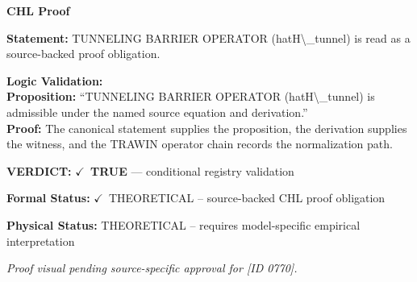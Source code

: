 \vspace{0.45em}
\noindent\textbf{CHL Proof}\par
\textbf{Statement:} TUNNELING BARRIER OPERATOR (hatH\textbackslash{}\_tunnel) is read as a source-backed proof obligation.

\textbf{Logic Validation:}\\
\textbf{Proposition:} ``TUNNELING BARRIER OPERATOR (hatH\textbackslash{}\_tunnel) is admissible under the named source equation and derivation.''\\
\textbf{Proof:} The canonical statement supplies the proposition, the derivation supplies the witness, and the TRAWIN operator chain records the normalization path.

\textbf{VERDICT:} \ensuremath{\checkmark}\ \textbf{TRUE} --- conditional registry validation

\textbf{Formal Status:} \ensuremath{\checkmark}\ THEORETICAL -- source-backed CHL proof obligation

\textbf{Physical Status:} THEORETICAL -- requires model-specific empirical interpretation
\par\vspace{0.45em}
\par
\vfill
\begingroup\footnotesize\itshape
Proof visual pending source-specific approval for [ID 0770].
\par\endgroup
\vfill
\endgroup
\endgroup
